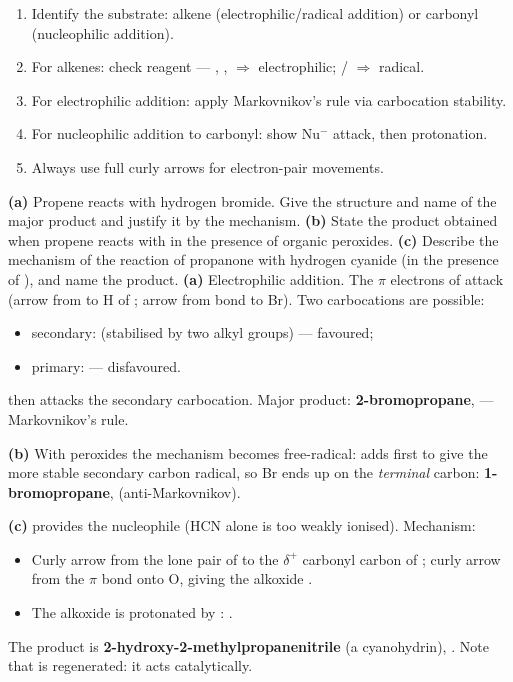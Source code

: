 \documentclass[11pt]{article}
\begin{document}
\begin{methode}
\begin{enumerate}
\item Identify the substrate: alkene (electrophilic/radical addition) or carbonyl (nucleophilic addition).
\item For alkenes: check reagent — , ,  $\Rightarrow$ electrophilic; / $\Rightarrow$ radical.
\item For electrophilic addition: apply Markovnikov's rule via carbocation stability.
\item For nucleophilic addition to carbonyl: show Nu$^-$ attack, then protonation.
\item Always use full curly arrows for electron-pair movements.
\end{enumerate}
\end{methode}

\begin{exoresolu}
\textbf{(a)} Propene reacts with hydrogen bromide. Give the structure and name of the major product and justify it by the mechanism. \textbf{(b)} State the product obtained when propene reacts with  in the presence of organic peroxides. \textbf{(c)} Describe the mechanism of the reaction of propanone with hydrogen cyanide (in the presence of ), and name the product.
\tcblower
\textbf{(a)} Electrophilic addition. The $\pi$ electrons of  attack  (arrow from  to H of ; arrow from  bond to Br). Two carbocations are possible:
\begin{itemize}
\item secondary:  (stabilised by two alkyl groups) — favoured;
\item primary:  — disfavoured.
\end{itemize}
 then attacks the secondary carbocation. Major product: \textbf{2-bromopropane},  — Markovnikov's rule.

\textbf{(b)} With peroxides the mechanism becomes free-radical:  adds first to give the more stable secondary carbon radical, so Br ends up on the \emph{terminal} carbon: \textbf{1-bromopropane},  (anti-Markovnikov).

\textbf{(c)}  provides the nucleophile  (HCN alone is too weakly ionised). Mechanism:
\begin{itemize}
\item Curly arrow from the lone pair of  to the $\delta^+$ carbonyl carbon of ; curly arrow from the  $\pi$ bond onto O, giving the alkoxide .
\item The alkoxide is protonated by : .
\end{itemize}
The product is \textbf{2-hydroxy-2-methylpropanenitrile} (a cyanohydrin), . Note that  is regenerated: it acts catalytically.
\end{exoresolu}
\end{document}
